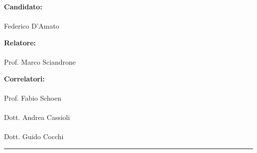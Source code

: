 {\Large \textbf{Candidato:}}\\
\vspace{-3.5mm}\\
{\LARGE Federico D'Amato\\}

{\Large \textbf{Relatore:}}\\
\vspace{-3.5mm}\\
{\LARGE Prof. Marco Sciandrone\\}

{\Large \textbf{Correlatori:}}\\
\vspace{-3.5mm}\\
{\LARGE Prof. Fabio Schoen}\\
\vspace{-3.5mm}\\
{\LARGE Dott. Andrea Cassioli}\\
\vspace{-3.5mm}\\
{\LARGE Dott. Guido Cocchi}\\


\vfill
\begin{center}
\rule{0.7\textwidth}{.4pt}
\end{center}
\vspace{-4mm}
